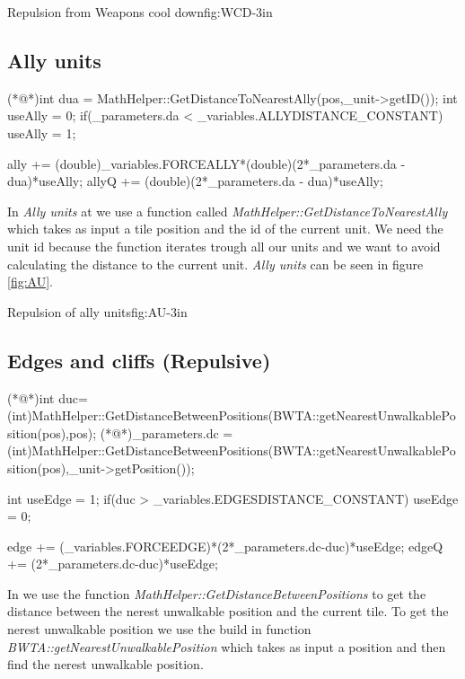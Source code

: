 		{Repulsion from Weapons cool down}{fig:WCD}{-3in}

	\subsection{Ally units}
		\begin{Sourcecode}[caption=Ally units]
(*@\lnote@*)int dua = MathHelper::GetDistanceToNearestAlly(pos,_unit->getID());
int useAlly = 0;
if(_parameters.da < _variables.ALLYDISTANCE_CONSTANT)
	useAlly = 1;

ally += (double)_variables.FORCEALLY*(double)(2*_parameters.da - dua)*useAlly;
allyQ += (double)(2*_parameters.da - dua)*useAlly;
\end{Sourcecode}	
	In \textit{Ally units} at  we use a function called \textit{MathHelper::GetDistanceToNearestAlly} which takes as input a tile position and the id of the current unit. We need the unit id because the function iterates trough all our units and we want to avoid calculating the distance to the current unit. \textit{Ally units} can be seen in figure \ref{fig:AU}.
	
			{Repulsion of ally units}{fig:AU}{-3in}

	\subsection{Edges and cliffs (Repulsive)}
	\begin{Sourcecode}[caption=Edges and cliffs]
(*@\lnote@*)int duc= (int)MathHelper::GetDistanceBetweenPositions(BWTA::getNearestUnwalkablePosition(pos),pos);
(*@\lnote@*)_parameters.dc = (int)MathHelper::GetDistanceBetweenPositions(BWTA::getNearestUnwalkablePosition(pos),_unit->getPosition());

int useEdge = 1;
if(duc > _variables.EDGESDISTANCE_CONSTANT)
	useEdge = 0;

edge += (_variables.FORCEEDGE)*(2*_parameters.dc-duc)*useEdge;
edgeQ += (2*_parameters.dc-duc)*useEdge;
\end{Sourcecode}	
    In  we use the function \textit{MathHelper::GetDistanceBetweenPositions} to get the distance between the nerest unwalkable position and the current tile. To get the nerest unwalkable position we use the build in function \textit{BWTA::getNearestUnwalkablePosition} which takes as input a position and then find the nerest unwalkable position.

